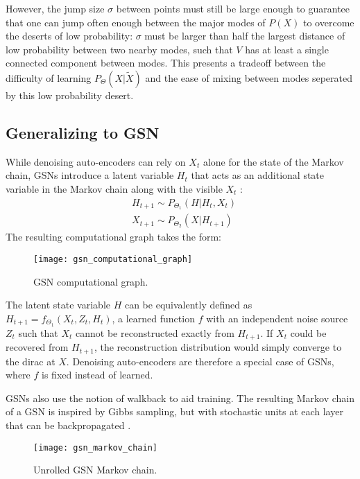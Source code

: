 However, the jump size \(\sigma\) between points must still be large enough to guarantee that one can jump often enough between the major modes of \(P(X)\) to overcome the deserts of low probability: \(\sigma\) must be larger than half the largest distance of low probability between two nearby modes, such that \(V\) has at least a single connected component between modes. This presents a tradeoff between the difficulty of learning \(P_{\Theta}(X|\widetilde{X})\) and the ease of mixing between modes seperated by this low probability desert.


\subsection{Generalizing to GSN}

While denoising auto-encoders can rely on \(X_t\) alone for the state of the Markov chain, GSNs introduce a latent variable \(H_t\) that acts as an additional state variable in the Markov chain along with the visible \(X_t\) \cite{gsn}:
\begin{align*}
 &H_{t+1} \sim P_{\Theta_1}(H|H_t, X_t)\\
 &X_{t+1} \sim  P_{\Theta_2}(X|H_{t+1})
\end{align*}
The resulting computational graph takes the form:

\begin{figure}[h!]
  \centering
    \texttt{[image: gsn\_computational\_graph]}
\caption{GSN computational graph.}
\end{figure}
The latent state variable \(H\) can be equivalently defined as \(H_{t+1} = f_{\Theta_1}(X_t,Z_t,H_t)\), a learned function \(f\) with an independent noise source \(Z_t\) such that \(X_t\) cannot be reconstructed exactly from \(H_{t+1}\). If \(X_t\) could be recovered from \(H_{t+1}\), the reconstruction distribution would simply converge to the dirac at \(X\). Denoising auto-encoders are therefore a special case of GSNs, where \(f\) is fixed instead of learned.

GSNs also use the notion of walkback to aid training. The resulting Markov chain of a GSN is inspired by Gibbs sampling, but with stochastic units at each layer that can be backpropagated \cite{rezende14}.

\begin{figure}[h!]
  \centering
    \texttt{[image: gsn\_markov\_chain]}
\caption{Unrolled GSN Markov chain.}
\end{figure}



